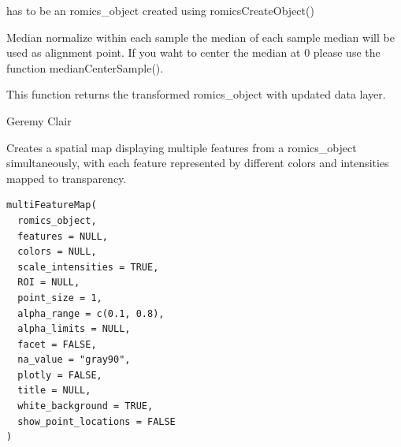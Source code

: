 \documentclass[a4paper]{book}
\begin{document}
%
\begin{Arguments}
\begin{ldescription}
\item[\code{romics\_object}] has to be an romics\_object created using romicsCreateObject()
\end{ldescription}
\end{Arguments}
%
\begin{Details}
Median normalize within each sample the median of each sample median will be used as alignment point. If you waht to center the median at 0 please use the function medianCenterSample().
\end{Details}
%
\begin{Value}
This function returns the transformed romics\_object with updated data layer.
\end{Value}
%
\begin{Author}
Geremy Clair
\end{Author}
%
\begin{Description}
Creates a spatial map displaying multiple features from a romics\_object simultaneously, with each feature represented by different colors and intensities mapped to transparency.
\end{Description}
%
\begin{Usage}
\begin{verbatim}
multiFeatureMap(
  romics_object,
  features = NULL,
  colors = NULL,
  scale_intensities = TRUE,
  ROI = NULL,
  point_size = 1,
  alpha_range = c(0.1, 0.8),
  alpha_limits = NULL,
  facet = FALSE,
  na_value = "gray90",
  plotly = FALSE,
  title = NULL,
  white_background = TRUE,
  show_point_locations = FALSE
)
\end{verbatim}
\end{Usage}
%
\end{document}
